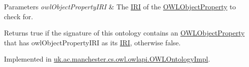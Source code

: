 \begin{DoxyParams}{Parameters}
{\em owl\-Object\-Property\-I\-R\-I} & The \hyperlink{classorg_1_1semanticweb_1_1owlapi_1_1model_1_1_i_r_i}{I\-R\-I} of the \hyperlink{interfaceorg_1_1semanticweb_1_1owlapi_1_1model_1_1_o_w_l_object_property}{O\-W\-L\-Object\-Property} to check for. \\
\hline
\end{DoxyParams}
\begin{DoxyReturn}{Returns}
{\ttfamily true} if the signature of this ontology contains an \hyperlink{interfaceorg_1_1semanticweb_1_1owlapi_1_1model_1_1_o_w_l_object_property}{O\-W\-L\-Object\-Property} that has {\ttfamily owl\-Object\-Property\-I\-R\-I} as its \hyperlink{classorg_1_1semanticweb_1_1owlapi_1_1model_1_1_i_r_i}{I\-R\-I}, otherwise {\ttfamily false}. 
\end{DoxyReturn}


Implemented in \hyperlink{classuk_1_1ac_1_1manchester_1_1cs_1_1owl_1_1owlapi_1_1_o_w_l_ontology_impl_a989984258e7260fd662226c33804267e}{uk.\-ac.\-manchester.\-cs.\-owl.\-owlapi.\-O\-W\-L\-Ontology\-Impl}.

